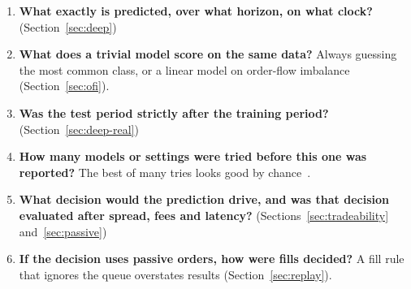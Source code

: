 \begin{enumerate}[leftmargin=1.8em,itemsep=2pt]
\item \textbf{What exactly is predicted, over what horizon, on what clock?} (Section~\ref{sec:deep})
\item \textbf{What does a trivial model score on the same data?} Always guessing the most common
  class, or a linear model on order-flow imbalance (Section~\ref{sec:ofi}).
\item \textbf{Was the test period strictly after the training period?} (Section~\ref{sec:deep-real})
\item \textbf{How many models or settings were tried before this one was reported?}
  The best of many tries looks good by chance~\citep{white2000,harvey2016}.
\item \textbf{What decision would the prediction drive, and was that decision evaluated after
  spread, fees and latency?} (Sections~\ref{sec:tradeability} and~\ref{sec:passive})
\item \textbf{If the decision uses passive orders, how were fills decided?} A fill rule that ignores
  the queue overstates results (Section~\ref{sec:replay}).
\end{enumerate}

